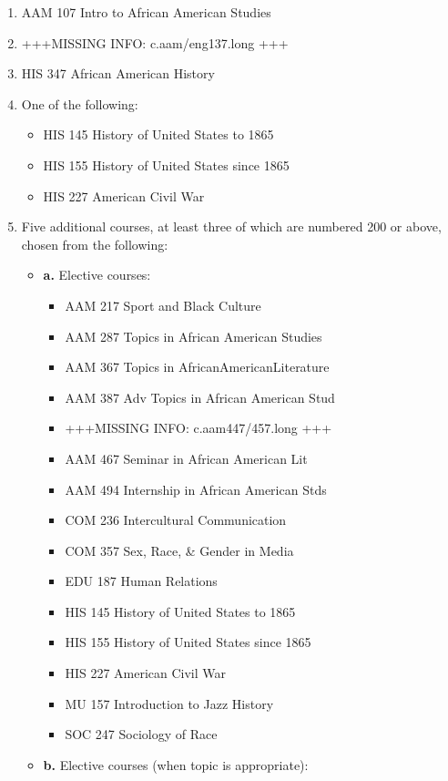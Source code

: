 \documentclass[
  letterpaper,
]{scrbook}
\providecommand{\tightlist}{%
  \setlength{\itemsep}{0pt}\setlength{\parskip}{0pt}}
\begin{document}
\begin{enumerate}
\def\labelenumi{\arabic{enumi}.}
\item
  AAM 107 Intro to African American Studies
\item
  +++MISSING INFO: c.aam/eng137.long +++
\item
  HIS 347 African American History
\item
  One of the following:

  \begin{itemize}
  \tightlist
  \item
    HIS 145 History of United States to 1865
  \item
    HIS 155 History of United States since 1865
  \item
    HIS 227 American Civil War
  \end{itemize}
\item
  Five additional courses, at least three of which are numbered 200 or
  above, chosen from the following:

  \begin{itemize}
  \tightlist
  \item
    \textbf{a.} Elective courses:

    \begin{itemize}
    \tightlist
    \item
      AAM 217 Sport and Black Culture
    \item
      AAM 287 Topics in African American Studies
    \item
      AAM 367 Topics in AfricanAmericanLiterature
    \item
      AAM 387 Adv Topics in African American Stud
    \item
      +++MISSING INFO: c.aam447/457.long +++
    \item
      AAM 467 Seminar in African American Lit
    \item
      AAM 494 Internship in African American Stds
    \item
      COM 236 Intercultural Communication
    \item
      COM 357 Sex, Race, \& Gender in Media
    \item
      EDU 187 Human Relations
    \item
      HIS 145 History of United States to 1865
    \item
      HIS 155 History of United States since 1865
    \item
      HIS 227 American Civil War
    \item
      MU 157 Introduction to Jazz History
    \item
      SOC 247 Sociology of Race
    \end{itemize}
  \item
    \textbf{b.} Elective courses (when topic is appropriate):
  \end{itemize}


\end{enumerate}
\end{document}
